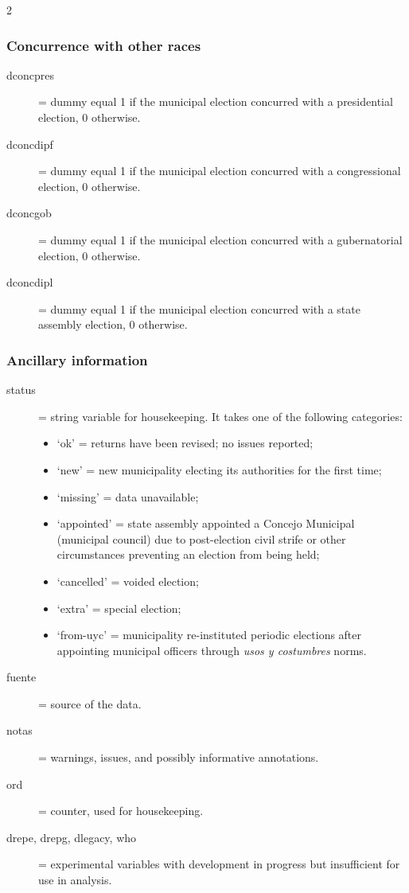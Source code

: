 \documentclass[letter,12pt]{article}
\begin{document}
\begin{singlespace}
\begin{multicols}{2}
\begin{footnotesize}
\subsubsection{Concurrence with other races}
\begin{description}
\item[dconcpres] = dummy equal 1 if the municipal election concurred with a presidential election, 0 otherwise. 
\item[dconcdipf] = dummy equal 1 if the municipal election concurred with a congressional election, 0 otherwise. 
\item[dconcgob]  = dummy equal 1 if the municipal election concurred with a gubernatorial election, 0 otherwise. 
\item[dconcdipl] = dummy equal 1 if the municipal election concurred with a state assembly election, 0 otherwise. 
\end{description}
\subsubsection{Ancillary information}
\begin{description}
\item[status] = string variable for housekeeping. It takes one of the following categories:
  \begin{itemize}
  \item `ok' = returns have been revised; no issues reported;
  \item `new' = new municipality electing its authorities for the first time;
  \item `missing' = data unavailable;
  \item `appointed' = state assembly appointed a Concejo Municipal (municipal council) due to post-election civil strife or other circumstances preventing an election from being held;
  \item `cancelled' = voided election;
  \item `extra' = special election;
  \item `from-uyc' = municipality re-instituted periodic elections after appointing municipal officers through \emph{usos y costumbres} norms.
  \end{itemize}
\item[fuente] = source of the data.
\item[notas] = warnings, issues, and possibly informative annotations.
\item[ord] = counter, used for housekeeping.
\item[drepe, drepg, dlegacy, who] = experimental variables with development in progress but insufficient for use in analysis.
\end{description}


\end{footnotesize}
\end{multicols}
\end{singlespace}
\end{document}
